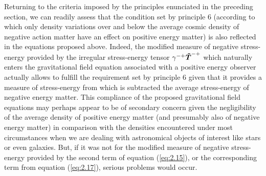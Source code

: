 \documentclass[notitlepage,12pt]{report}
\newcommand{\bm}[1]{\mbox{\boldmath $#1$}}
\begin{document}
Returning to the criteria imposed by the principles enunciated in the preceding section, we can readily assess that the condition set by principle 6 (according to which only density variations over and below the average cosmic density of negative action matter have an effect on positive energy matter) is also reflected in the equations proposed above. Indeed, the modified measure of negative stress-energy provided by the irregular stress-energy tensor $\gamma^{-+}\bm{\tilde{T}}^{-+}$ which naturally enters the gravitational field equation associated with a positive energy observer actually allows to fulfill the requirement set by principle 6 given that it provides a measure of stress-energy from which is subtracted the average stress-energy of negative energy matter. This compliance of the proposed gravitational field equations may perhaps appear to be of secondary concern given the negligibility of the average density of positive energy matter (and presumably also of negative energy matter) in comparison with the densities encountered under most circumstances when we are dealing with astronomical objects of interest like stars or even galaxies. But, if it was not for the modified measure of negative stress-energy provided by the second term of equation (\ref{eq:2.15}), or the corresponding term from equation (\ref{eq:2.17}), serious problems would occur.
\end{document}
